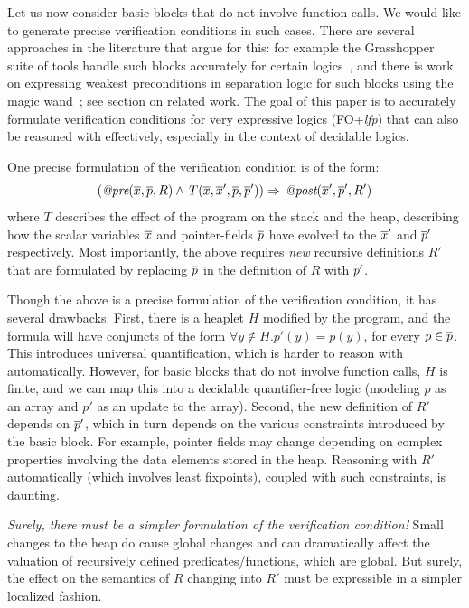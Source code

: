 Let us now consider basic blocks that do not involve function calls. We would like
to generate precise verification conditions in such cases. There are several approaches in the literature that argue for this: for example the Grasshopper suite of tools
handle such blocks accurately for certain logics~\cite{PiskacWiesZufferey2014}, and there is work on expressing weakest preconditions in separation logic for such blocks using the magic wand~\cite{Reynolds2002}; see section on related work. The goal of this paper is to accurately formulate verification conditions for very expressive logics (FO+\textit{lfp}) that can also be reasoned with effectively, especially in the context of decidable logics.

One precise formulation of the verification condition is of the form:
$$\left(\textit{@pre}(\overline{x}, \overline{p}, R) \wedge\, T(\overline{x}, \overline{x}', \overline{p}, \overline{p}')\right) \Rightarrow\, \textit{@post}(\overline{x}', \overline{p}', R')$$
where $T$ describes the effect of the program on the stack and the heap, describing how the scalar variables $\overline{x}$ and pointer-fields $\overline{p}$ have evolved to the $\overline{x}'$ and $\overline{p}'$ respectively. Most importantly, the above requires \emph{new} recursive definitions $R'$ that are formulated by replacing $\overline{p}$ in the definition of $R$ with $\overline{p}'$. 

Though the above is a precise formulation of the verification condition, it has several drawbacks. First, there is a heaplet $H$
modified by the program, and the formula will have conjuncts of the form $\forall y \not \in H. p'(y)=p(y)$, for every $p \in \overline{p}$. This introduces
universal quantification, which is harder to reason with automatically. However, for basic blocks that do not involve
function calls, $H$ is finite, and we can map this into a decidable quantifier-free logic (modeling $p$ as an array
and $p'$ as an update to the array).
Second, the new definition of $R'$ depends on $\overline{p}'$, which in turn depends on the various constraints introduced by the basic
block. For example, pointer fields may change depending on complex properties involving the data elements stored in the heap.
Reasoning with $R'$ automatically (which involves least fixpoints), coupled with such constraints, is daunting.

\emph{Surely, there must be a simpler formulation of the verification condition!} Small changes to the heap do cause global changes and
can dramatically affect the valuation of recursively defined predicates/functions, which are global.
But surely, the effect on the semantics of $R$ changing into $R'$ must be expressible in a simpler localized fashion.

